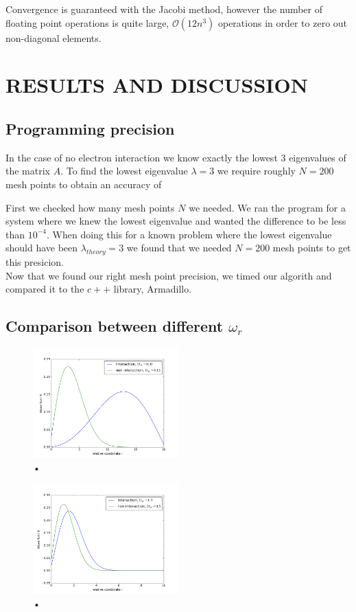 \documentclass[%
 reprint,
 nobalancelastpage,
 amsmath,amssymb,
 aps,
]{revtex4-1}
\begin{document}
Convergence is guaranteed with the Jacobi method, however the number of floating point operations is quite large, $\mathcal{O}(12n^{3})$ operations in order to zero out non-diagonal elements.


\section{RESULTS AND DISCUSSION}

\subsection{Programming precision}
In the case of no electron interaction we know exactly the lowest 3 eigenvalues of the matrix $A$. To find the lowest eigenvalue $\lambda = 3$ we require roughly $N = 200$ mesh points to obtain an accuracy of 

First we checked how many mesh points $N$ we needed. We ran the program for a system where we knew the lowest eigenvalue and wanted the difference to be less than $10^{-4}$. When doing this for a known problem where the lowest eigenvalue should have been $\lambda_{theory} = 3$ we found that we needed $N=200$ mesh points to get this presicion.\\
Now that we found our right mesh point precision, we timed our algorith and compared it to the $c++$ library, Armadillo.

\subsection{Comparison between different $\omega_r$}

 \begin{figure}[h]
\centering
\includegraphics[width=0.5\textwidth]{../omega001.png}
\caption{•}
\label{fig:my_label}
\end{figure}

 \begin{figure}[h]
\centering
\includegraphics[width=0.5\textwidth]{../omega05.png}
\caption{•}
\label{fig:my_label}
\end{figure}
\end{document}
